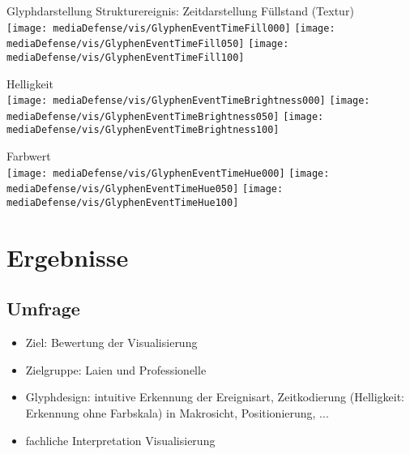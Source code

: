 \documentclass[10pt]{beamer}
\begin{document}
\begin{frame}{Glyphdarstellung Strukturereignis: Zeitdarstellung}
	Füllstand (Textur)\\
					\texttt{[image: mediaDefense/vis/GlyphenEventTimeFill000]}
					\hspace*{.1\textwidth}%
					\texttt{[image: mediaDefense/vis/GlyphenEventTimeFill050]}
					\hspace*{.1\textwidth}%
					\texttt{[image: mediaDefense/vis/GlyphenEventTimeFill100]}

	Helligkeit\\
					\texttt{[image: mediaDefense/vis/GlyphenEventTimeBrightness000]}
					\hspace*{.1\textwidth}%
					\texttt{[image: mediaDefense/vis/GlyphenEventTimeBrightness050]}
					\hspace*{.1\textwidth}%
					\texttt{[image: mediaDefense/vis/GlyphenEventTimeBrightness100]}

	Farbwert\\
					\texttt{[image: mediaDefense/vis/GlyphenEventTimeHue000]}
					\hspace*{.1\textwidth}%
					\texttt{[image: mediaDefense/vis/GlyphenEventTimeHue050]}
					\hspace*{.1\textwidth}%
					\texttt{[image: mediaDefense/vis/GlyphenEventTimeHue100]}
\end{frame}

\section{Ergebnisse}

\subsection{Umfrage}
\begin{frame}
	\begin{itemize}
		\item Ziel: Bewertung der Visualisierung
		\item Zielgruppe: Laien und Professionelle
		\item Glyphdesign: intuitive Erkennung der Ereignisart, Zeitkodierung (Helligkeit: Erkennung ohne Farbskala) in Makrosicht, Positionierung, ...
		\item fachliche Interpretation Visualisierung
	\end{itemize}
\end{frame}
\end{document}
